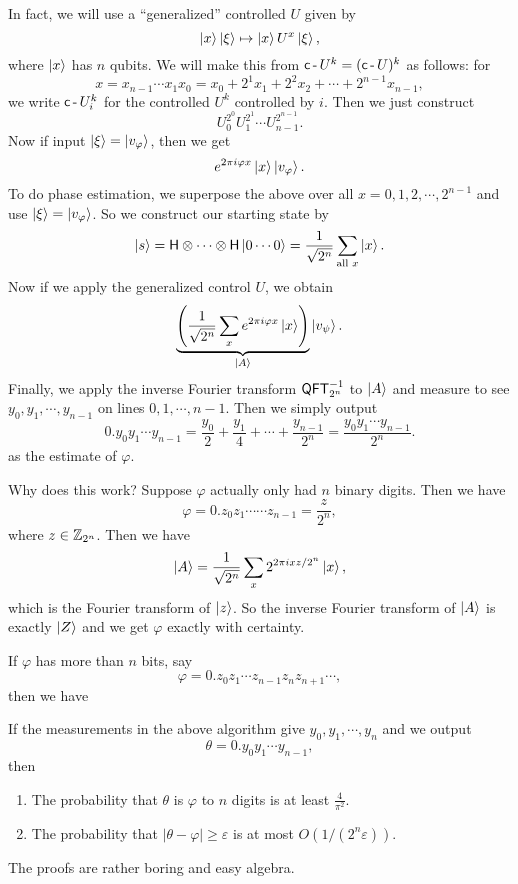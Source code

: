 In fact, we will use a ``generalized'' controlled $U$ given by
\[
  \left\lvert x\right\rangle \left\lvert \xi\right\rangle \mapsto \left\lvert x\right\rangle U^x \left\lvert \xi\right\rangle,
\]
where $\left\lvert x\right\rangle$ has $n$ qubits. We will make this from $\mathsf{c}\operatorname{-} U^k = (\mathsf{c}\operatorname{-} U)^k$ as follows: for
\[
  x = x_{n - 1} \cdots x_1 x_0 = x_0 + 2^1 x_1 + 2^2 x_2 + \cdots + 2^{n - 1}x_{n - 1},
\]
we write $\mathsf{c}\operatorname{-} U^k_i$ for the controlled $U^k$ controlled by $i$. Then we just construct
\[
  U^{2^0}_0 U^{2^1}_1 \cdots U^{2^{n - 1}}_{n - 1}.
\]
Now if input $\left\lvert \xi\right\rangle = \left\lvert v_{\varphi}\right\rangle$, then we get
\[
  e^{2\pi i \varphi x} \left\lvert x\right\rangle \left\lvert v_\varphi\right\rangle.
\]
To do phase estimation, we superpose the above over all $x = 0, 1, 2, \cdots, 2^{n - 1}$ and use $\left\lvert \xi\right\rangle = \left\lvert v_\varphi\right\rangle$. So we construct our starting state by
\[
  \left\lvert s\right\rangle = \mathsf{H} \otimes \cdots \otimes \mathsf{H} \left\lvert 0\cdots0\right\rangle = \frac{1}{\sqrt{2^n}} \sum_{\text{all }x} \left\lvert x\right\rangle.
\]
Now if we apply the generalized control $U$, we obtain
\[
  \underbrace{\left(\frac{1}{\sqrt{2^n}} \sum_x e^{2\pi i \varphi x}\left\lvert x\right\rangle\right)}_{\left\lvert A\right\rangle} \left\lvert v_\psi\right\rangle.
\]
Finally, we apply the inverse Fourier transform $\mathsf{QFT}_{2^n}^{-1}$ to $\left\lvert A\right\rangle$ and measure to see $y_0, y_1, \cdots, y_{n -1 }$ on lines $0, 1, \cdots, n - 1$. Then we simply output
\[
  0.y_0 y_1 \cdots y_{n - 1} = \frac{y_0}{2} + \frac{y_1}{4} + \cdots + \frac{y_{n - 1}}{2^n} = \frac{y_0 y_1 \cdots y_{n - 1}}{2^n}.
\]
as the estimate of $\varphi$.

Why does this work? Suppose $\varphi$ actually only had $n$ binary digits. Then we have
\[
  \varphi = 0.z_0 z_1 \cdots \cdots z_{n - 1} = \frac{z}{2^n},
\]
where $z \in \mathbb{Z}_{2^n}$. Then we have
\[
  \left\lvert A\right\rangle = \frac{1}{\sqrt{2^n}} \sum_x 2^{2\pi i x z/2^n} \left\lvert x\right\rangle,
\]
which is the Fourier transform of $\left\lvert z\right\rangle$. So the inverse Fourier transform of $\left\lvert A\right\rangle$ is exactly $\left\lvert Z\right\rangle$ and we get $\varphi$ exactly with certainty.

If $\varphi$ has more than $n$ bits, say
\[
  \varphi = 0.z_0z_1 \cdots z_{n - 1}z_n z_{n + 1} \cdots,
\]
then we have
\begin{thm}
  If the measurements in the above algorithm give $y_0, y_1, \cdots, y_n$ and we output
  \[
    \theta = 0.y_0 y_1 \cdots y_{n - 1},
  \]
  then
  \begin{enumerate}
    \item The probability that $\theta$ is $\varphi$ to $n$ digits is at least $\frac{4}{\pi^2}$.
    \item The probability that $|\theta - \varphi| \geq \varepsilon$ is at most $O(1/(2^n \varepsilon))$.
  \end{enumerate}
\end{thm}
The proofs are rather boring and easy algebra.

